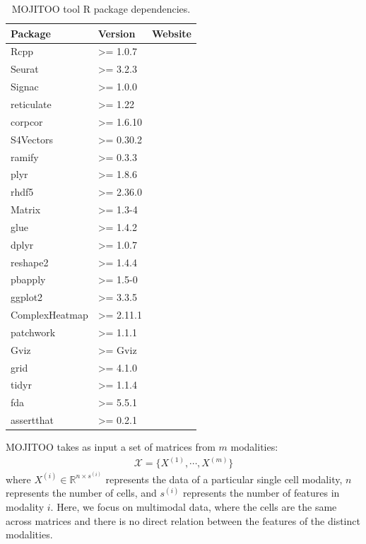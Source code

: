 \begin{table}[!ht]
	\centering
	\begin{tabular}{lll}
		\toprule
		\textbf{Package} & \textbf{Version} & \textbf{Website} \\
		\midrule
		  Rcpp  & >= 1.0.7& \url{} \\
		  Seurat & >= 3.2.3 & \url{} \\
		  Signac & >= 1.0.0& \url{} \\
		  reticulate & >= 1.22& \url{} \\
		  corpcor & >= 1.6.10 & \url{} \\
		  S4Vectors & >= 0.30.2 & \url{} \\
		  ramify & >= 0.3.3 & \url{} \\
		  plyr & >= 1.8.6 & \url{} \\
		  rhdf5 & >= 2.36.0 & \url{} \\
		  Matrix & >= 1.3-4 & \url{} \\
		  glue & >= 1.4.2 & \url{} \\
		  dplyr & >= 1.0.7 & \url{} \\
		  reshape2 & >= 1.4.4 & \url{} \\
		  pbapply & >= 1.5-0 & \url{} \\
		  ggplot2 & >= 3.3.5 & \url{} \\
		  ComplexHeatmap & >= 2.11.1 & \url{} \\
		  patchwork & >= 1.1.1 & \url{} \\
		  Gviz & >= Gviz & \url{} \\
		  grid & >= 4.1.0 & \url{} \\
		  tidyr & >= 1.1.4 & \url{} \\
		  fda & >= 5.5.1 & \url{} \\
		  assertthat & >= 0.2.1 & \url{} \\
		\bottomrule
	\end{tabular}
	\vspace{0.1cm}
	\caption[MOJITOO tool R package dependencies]{MOJITOO tool R package dependencies.}
	\label{tab:mojitoo_R_dependencies}
\end{table}
  

MOJITOO takes as input a set of matrices from $m$ modalities:
\begin{align}
    \mathcal{X}=\{X^{(1)},\cdots,X^{(m)}\}
\end{align}
where $X^{(i)} \in \mathbb{R}^{n\times s^{(i)}}$ represents the data of a particular single cell modality, $n$ represents the number of cells, and $s^{(i)}$ represents the number of features in modality $i$. Here, we focus on multimodal data, where the cells are the same across matrices and there is no direct relation between the features of the distinct modalities. 

